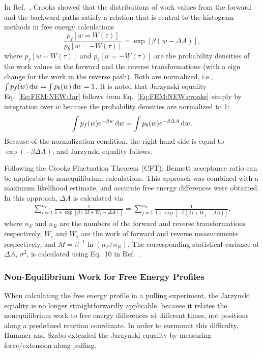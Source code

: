 In Ref.~\cite{CrooksJSP1998}, Crooks showed that the distributions of work values from the forward and the backward paths satisfy a relation that is central to the histogram methods in free energy calculations
\begin{equation}
    \frac{p_{f}[w=W(\tau)]}{p_{b}[w=-\underline{W}(\tau)]}=\exp[\beta(w-\Delta A)],
    \label{Eq:FEM:NEW:crooks}
\end{equation}
where $p_{f}[w=W(\tau)]$ and $p_{b}[w=-\underline{W}(\tau)]$ are the probability densities of the work values in the forward and the reverse transformations (with a sign change for the work in the reverse path). Both are normalized, i.e., $\int p_{f}(w) \mathop{}\!\mathrm{d} w=\int p_{b}(w) \mathop{}\!\mathrm{d} w=1$. It is noted that Jarzynski equality Eq.~\ref{Eq:FEM:NEW:Jar} follows from Eq.~\ref{Eq:FEM:NEW:crooks} simply by integration over $w$ because the probability densities are normalized to 1:
\begin{equation}
    \int p_{f}(w)e^{-\beta w}\mathop{}\!\mathrm{d} w=\int p_{b}(w)e^{-\beta \Delta A}\mathop{}\!\mathrm{d} w,
    \label{Eq:FEM:NEW:crookstojar}
\end{equation}
Because of the normalization condition, the right-hand side is equal to $\exp(-\beta \Delta A)$, and Jarzynski equality follows.

Following the Crooks Fluctuation Theorem (CFT),\cite{CrooksJSP1998} Bennett acceptance ratio can be applicable to nonequilibrium calculations. This approach was combined with a maximum likelihood estimate, and accurate free energy differences were obtained.\cite{ShirtsPRL2003}
In this approach, $\Delta A$ is calculated via
\begin{align}
    \sum_{i=1}^{n_{F}}\frac{1}{1+\exp \left[\beta(M+W_{i}-\Delta A)\right]} = \sum_{j=1}^{n_{R}}\frac{1}{1+\exp \left[-\beta(M+W_{j}-\Delta A)\right]},
    \label{Eq:FEM:NEW:NEBAR}
\end{align}
where $n_{F}$ and $n_{R}$ are the numbers of the forward and reverse transformations respectively, $W_{i}$ and $W_{j}$ are the work of forward and reverse measurements respectively, and $M=\beta^{-1}\ln(n_{F}/n_{R})$.
The corresponding statistical variance of $ \Delta A $, $ \sigma^2 $, is calculated using Eq.~10 in Ref.~\cite{ShirtsPRL2003}.

\subsubsection{Non-Equilibrium Work for Free Energy Profiles\label{Sec:FEM:NEW:FEP}}
When calculating the free energy profile in a pulling experiment, the Jarzynski equality is no longer straightforwardly applicable, because it relates the nonequilibrium work to free energy differences at different times, not positions along a predefined reaction coordinate. In order to surmount this difficulty, Hummer and Szabo extended the Jarzynski equality by measuring force/extension along pulling.\cite{HummerPNAS2001}

